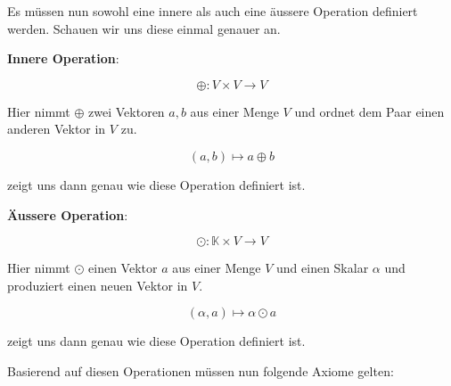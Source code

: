\vspace{1\baselineskip}

Es müssen nun sowohl eine innere als auch eine äussere Operation definiert werden. Schauen wir uns diese einmal genauer an.

\vspace{1\baselineskip}

\textbf{Innere Operation}:

\begin{equation*}
    \oplus: V \times V \rightarrow V 
\end{equation*}

Hier nimmt \( \oplus \) zwei Vektoren \( a, b \) aus einer Menge \( V \) und ordnet dem Paar einen anderen Vektor in \( V \) zu. 

\begin{equation*}
    (a, b) \mapsto a \oplus b
\end{equation*}

zeigt uns dann genau wie diese Operation definiert ist.

\vspace{1\baselineskip}

\textbf{Äussere Operation}:

\begin{equation*}
    \odot: \mathbb{K} \times V \rightarrow V
\end{equation*}

Hier nimmt \( \odot \) einen Vektor \( a \) aus einer Menge \( V \) und einen Skalar \( \alpha \)  und produziert einen neuen Vektor in \( V \).

\begin{equation*}
    (\alpha, a) \mapsto \alpha \odot a
\end{equation*}

zeigt uns dann genau wie diese Operation definiert ist.

\vspace{1\baselineskip}

Basierend auf diesen Operationen müssen nun folgende Axiome gelten:

